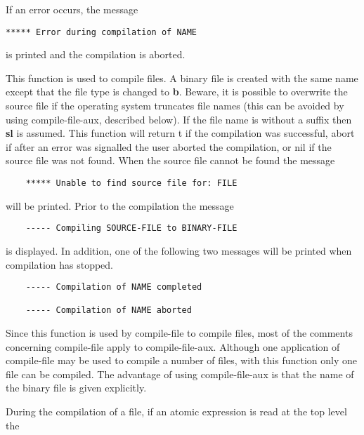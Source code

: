 If an error occurs, the message
\begin{verbatim}
***** Error during compilation of NAME
\end{verbatim}
is printed and the compilation is aborted.


{    This function is used to compile files.  A  binary  file  is
    created  with  the  same  name  except that the file type is
    changed to {\bf b}. Beware, it is possible to overwrite the source
    file if the operating system truncates file names (this  can
    be  avoided  by using compile-file-aux, described below). If
    the file name is without a suffix then {\bf sl} is assumed. This
    function  will  return  t if the compilation was successful,
    abort if after an error was signalled the user  aborted  the
    compilation,  or  nil if the source file was not found. When
    the source file cannot be found the message
}
\begin{verbatim}
    ***** Unable to find source file for: FILE
\end{verbatim}
    will be printed. Prior to the compilation the message

\begin{verbatim}
    ----- Compiling SOURCE-FILE to BINARY-FILE
\end{verbatim}
    is displayed. In addition, one of the following two messages
    will be printed when compilation has stopped.

\begin{verbatim}
    ----- Compilation of NAME completed

    ----- Compilation of NAME aborted
\end{verbatim}

{    
    Since this function  is  used  by  compile-file  to  compile
    files, most of the comments concerning compile-file apply to
    compile-file-aux.   Although one application of compile-file
    may be used to compile a number of files, with this function
    only one file can be  compiled.    The  advantage  of  using
    compile-file-aux  is  that  the  name  of the binary file is
    given explicitly.
}

  During the compilation of a file, if an atomic  expression  is
read at the top level the

